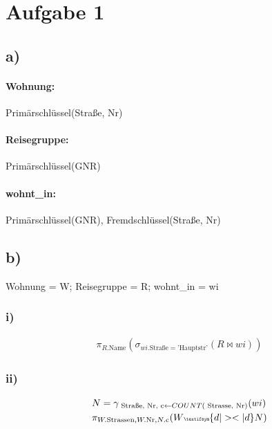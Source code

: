 \section*{Aufgabe 1}
\subsection*{a)}
\paragraph*{Wohnung:} Primärschlüssel(Straße, Nr)
\paragraph*{Reisegruppe:} Primärschlüssel(GNR)
\paragraph*{wohnt\_in:} Primärschlüssel(GNR), Fremdschlüssel(Straße, Nr)
\subsection*{b)}
Wohnung = W; Reisegruppe = R; wohnt\_in = wi
\subsubsection*{i)}
\begin{align*}
  \pi _{ R.\text{Name} } (\sigma _{ wi.\text{Straße} = \text{'Hauptstr'} } (R\Join wi))
\end{align*}
\subsubsection*{ii)}
\begin{align*}
  &N = \gamma _{ \text{ Straße, Nr, c} \leftarrow COUNT(\text{ Strasse, Nr}) } (wi) \\
  &\pi _{ W.\text{Strassen}, W.\text{Nr}, N.\text{c}} (W {\tiny \textifsym{d|><|d}} N)
\end{align*}
